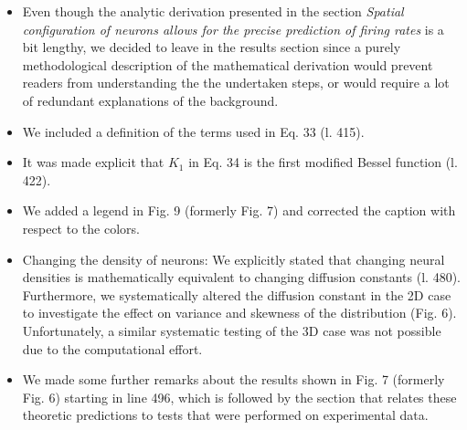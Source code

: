 \documentclass[10pt,a4paper]{article}
\begin{document}
\begin{itemize}
\item Even though the analytic derivation presented in the section \textit{Spatial configuration of neurons allows for the precise prediction of firing rates} is a bit lengthy, we decided to leave in the results section since a purely methodological description of the mathematical derivation would prevent readers from understanding the the undertaken steps, or would require a lot of redundant explanations of the background.

\item We included a definition of the terms used in Eq. 33 (l. 415).

\item It was made explicit that $K_1$ in Eq. 34 is the first modified Bessel function (l. 422).

\item We added a legend in Fig. 9 (formerly Fig. 7) and corrected the caption with respect to the colors.  

\item Changing the density of neurons: We explicitly stated that changing neural densities is mathematically equivalent to changing diffusion constants (l. 480). Furthermore, we systematically altered the diffusion constant in the 2D case to investigate the effect on variance and skewness of the distribution (Fig. 6). Unfortunately, a similar systematic testing of the 3D case was not possible due to the computational effort.

\item We made some further remarks about the results shown in Fig. 7 (formerly Fig. 6) starting in line 496, which is followed by the section that relates these theoretic predictions to tests that were performed on experimental data.
\end{itemize}
\end{document}
